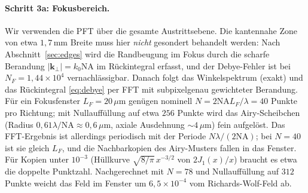 \documentclass[11pt,a4paper]{scrartcl}
\theoremstyle{insightstyle}
\newcommand{\kp}{\bm{k}_\perp}
\newcommand{\NA}{\mathrm{NA}}
\begin{document}
\paragraph{Schritt 3a: Fokusbereich.} Wir verwenden die PFT über die gesamte Austrittsebene. Die kantennahe Zone von etwa $1{,}7\,$mm Breite muss hier \emph{nicht} gesondert behandelt werden: Nach Abschnitt~\ref{sec:edges} wird die Randbeugung im Fokus durch die scharfe Berandung $|\kp|=k_0\NA$ im Rückintegral erfasst, und der Debye-Fehler ist bei $N_F=1{,}44\times10^4$ vernachlässigbar. Danach folgt das Winkelspektrum (exakt) und das Rückintegral \eqref{eq:debye} per FFT mit subpixelgenau gewichteter Berandung. Für ein Fokusfenster $L_F=20\,\mu$m genügen nominell $N=2\NA L_F/\lambda=40$ Punkte pro Richtung; mit Nullauffüllung auf etwa $256$ Punkte wird das Airy-Scheibchen (Radius $0{,}61\lambda/\NA\approx0{,}6\,\mu$m, axiale Ausdehnung $\sim4\,\mu$m) fein aufgelöst. Das FFT-Ergebnis ist allerdings periodisch mit der Periode $N\lambda/(2\NA)$; bei $N=40$ ist sie gleich $L_F$, und die Nachbarkopien des Airy-Musters fallen in das Fenster. Für Kopien unter $10^{-3}$ (Hüllkurve $\sqrt{8/\pi}\,x^{-3/2}$ von $2J_1(x)/x$) braucht es etwa die doppelte Punktzahl. Nachgerechnet mit $N=78$ und Nullauffüllung auf $312$ Punkte weicht das Feld im Fenster um $6{,}5\times10^{-4}$ vom Richards-Wolf-Feld ab.
\end{document}
